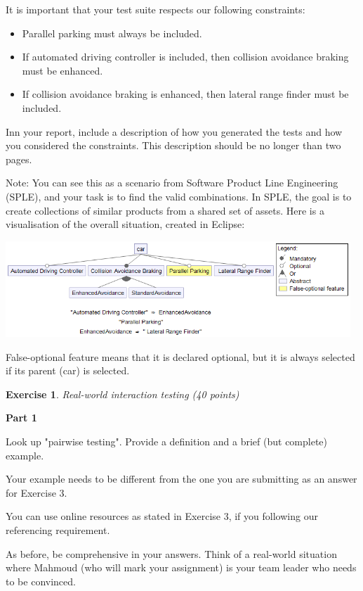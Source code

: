 \documentclass{pracs}
\newtheorem{exercise}{Exercise}
\begin{document}
It is important that your test suite respects our following constraints:
\begin{itemize}
\item Parallel parking must always be included.
\item If automated driving controller is included, then collision avoidance braking must be enhanced.
\item If collision avoidance braking is enhanced, then lateral range finder must be included.
\end{itemize}

Inn your report, include a description of how you generated the tests and how you considered the constraints. This description should be no longer than two pages.

Note: You can see this as a scenario from Software Product Line Engineering (SPLE), and your task is to find the valid combinations. In SPLE, the goal is to create collections of similar products from a shared set of assets. Here is a visualisation of the overall situation, created in Eclipse:

\begin{center}
\includegraphics[width=130mm]{q3p2_car_assignment1AbstractConstraints.png}
\end{center}

False-optional feature means that it is declared optional, but it is always selected if its parent (car) is selected.


\begin{exercise}
Real-world interaction testing (40 points)
\end{exercise}

\textbf{Part 1}

Look up "pairwise testing". Provide a definition and a brief (but complete) example.

Your example needs to be different from the one you are submitting as an answer for Exercise 3.

You can use online resources as stated in Exercise 3, if you following our referencing requirement.

As before, be comprehensive in your answers. Think of a real-world situation where Mahmoud (who will mark your assignment) is your team leader who needs to be convinced.
\end{document}
